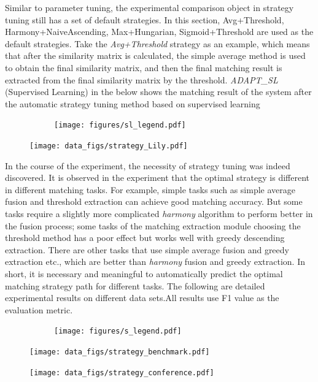 \documentclass[twoside]{article}
\begin{document}
Similar to parameter tuning, the experimental comparison object in strategy tuning still has a set of default strategies. In this section, Avg+Threshold, Harmony+NaiveAscending, Max+Hungarian, Sigmoid+Threshold are used as the default strategies.
Take the {\it Avg+Threshold} strategy as an example, which means that after the similarity matrix is calculated, the simple average method is used to obtain the final similarity matrix, and then the final matching result is extracted from the final similarity matrix by the threshold.
{\it ADAPT\_SL} (Supervised Learning) in the below shows the matching result of the system after the automatic strategy tuning method based on supervised learning
\begin{figure}[htb!]\centering
\begin{subfigure}{\textwidth}
	\centering
	\texttt{[image: figures/sl\_legend.pdf]}
\end{subfigure}
\begin{minipage}{0.5\textwidth}
	\centering
	\setlength{\abovecaptionskip}{0pt}
	\setlength{\belowcaptionskip}{0pt}
	\texttt{[image: data\_figs/strategy\_Lily.pdf]}
	\label{fig:strategy_Lily}
\end{minipage}%
\end{figure}
In the course of the experiment, the necessity of strategy tuning was indeed discovered.
It is observed in the experiment that the optimal strategy is different in different matching tasks.
For example, simple tasks such as simple average fusion and threshold extraction can achieve good matching accuracy. But some tasks require a slightly more complicated {\it harmony} algorithm to perform better in the fusion process; some tasks of the matching extraction module choosing the threshold method has a poor effect but works well with greedy descending extraction. There are other tasks that use simple average fusion and greedy extraction etc., which are better than {\it harmony} fusion and greedy extraction.
In short, it is necessary and meaningful to automatically predict the optimal matching strategy path for different tasks.
The following are detailed experimental results on different data sets.All results use F1 value as the evaluation metric.
\begin{figure}[htb!]\centering
\begin{subfigure}{\textwidth}
	\centering
	\texttt{[image: figures/s\_legend.pdf]}
\end{subfigure}
\begin{minipage}{0.49\textwidth}
	\centering
	\texttt{[image: data\_figs/strategy\_benchmark.pdf]}
	\label{fig:strategy_benchmark}
\end{minipage}%
\begin{minipage}{0.49\textwidth}
	\centering
	\texttt{[image: data\_figs/strategy\_conference.pdf]}
	\label{fig:strategy_conference}
\end{minipage}%
\end{figure}
\end{document}
